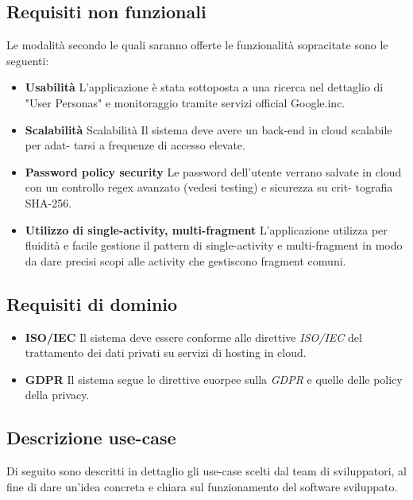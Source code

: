 \subsection{Requisiti non funzionali}
Le modalità secondo le quali saranno offerte le funzionalità sopracitate sono le seguenti:
\begin{itemize}
  \item \textbf{Usabilità} L'applicazione è stata sottoposta a una ricerca nel dettaglio di
        "User Personas" e monitoraggio tramite servizi official Google.inc.
  \item \textbf{Scalabilità}
        Scalabilità Il sistema deve avere un back-end in cloud scalabile per adat-
        tarsi a frequenze di accesso elevate.
  \item \textbf{Password policy security} Le password dell'utente verrano salvate in
        cloud con un controllo regex avanzato (vedesi testing) e sicurezza su crit-
        tografia SHA-256.
  \item \textbf{Utilizzo di single-activity, multi-fragment} L'applicazione utilizza per
        fluidità e facile gestione il pattern di single-activity e multi-fragment in modo
        da dare precisi scopi alle activity che gestiscono fragment comuni.
\end{itemize}
\subsection{Requisiti di dominio}
\begin{itemize}
  \item \textbf{ISO/IEC} Il sistema deve essere conforme alle direttive \textit{ISO/IEC} del trattamento dei dati privati su servizi di hosting in cloud.
  \item \textbf{GDPR} Il sistema segue le direttive euorpee sulla \textit{GDPR} e quelle delle policy della privacy.
\end{itemize}
\subsection{Descrizione use-case}
Di seguito sono descritti in dettaglio gli use-case scelti dal team di sviluppatori, al fine di dare un'idea concreta e chiara sul funzionamento del software sviluppato.
